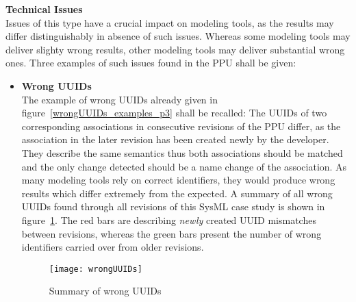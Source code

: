  \textbf{Technical Issues}\\
 Issues of this type have a crucial impact on modeling tools, as the results
 may differ distinguishably in absence of such issues. Whereas some modeling
 tools may deliver slighty wrong results, other modeling tools may deliver
 substantial wrong ones. Three examples of such issues found in the \ac{PPU}
 shall be given:
 \begin{itemize}
   \item \textbf{Wrong \ac{UUID}s}\\
   		 The example of
		 wrong \ac{UUID}s already given in figure~\ref{wrongUUIDs_examples_p3} shall
	 	 be recalled: The \ac{UUID}s of two corresponding associations in consecutive
	 	 revisions of the \ac{PPU} differ, as the association in the later revision
	 	 has been created newly by the developer. They describe the same semantics
	 	 thus both associations should be matched and the only change detected should
	 	 be a name change of the association. As many modeling tools rely on correct
	 	 identifiers, they would produce wrong results which differ extremely from
	 	 the expected. A summary of all wrong \ac{UUID}s found through all revisions
	 	 of this \ac{SysML} case study is shown in figure~\ref{wrongUUIDs_summary}.
	 	 The red bars are describing \textit{newly} created \ac{UUID} mismatches
	 	 between revisions, whereas the green bars present the number of wrong
	 	 identifiers carried over from older revisions.
	 	 	 	
		\begin{figure}[h!]
		\begin{center}
		\texttt{[image: wrongUUIDs]}\\
		\end{center}
		\caption{Summary of wrong \ac{UUID}s}
		\label{wrongUUIDs_summary}
		\end{figure}
		

\end{itemize}
